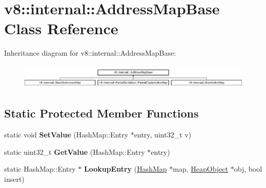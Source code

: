 \hypertarget{classv8_1_1internal_1_1_address_map_base}{}\section{v8\+:\+:internal\+:\+:Address\+Map\+Base Class Reference}
\label{classv8_1_1internal_1_1_address_map_base}
Inheritance diagram for v8\+:\+:internal\+:\+:Address\+Map\+Base\+:\begin{figure}[H]
\begin{center}
\leavevmode
\includegraphics[height=1.196581cm]{classv8_1_1internal_1_1_address_map_base}
\end{center}
\end{figure}
\subsection*{Static Protected Member Functions}
\begin{DoxyCompactItemize}
\item 
static void {\bfseries Set\+Value} (Hash\+Map\+::\+Entry $\ast$entry, uint32\+\_\+t v)\hypertarget{classv8_1_1internal_1_1_address_map_base_ad901a40bc8f6ae8364f2fdaf10e46ee9}{}\label{classv8_1_1internal_1_1_address_map_base_ad901a40bc8f6ae8364f2fdaf10e46ee9}

\item 
static uint32\+\_\+t {\bfseries Get\+Value} (Hash\+Map\+::\+Entry $\ast$entry)\hypertarget{classv8_1_1internal_1_1_address_map_base_ac940b73338cebdd25c26ea0dea9a6512}{}\label{classv8_1_1internal_1_1_address_map_base_ac940b73338cebdd25c26ea0dea9a6512}

\item 
static Hash\+Map\+::\+Entry $\ast$ {\bfseries Lookup\+Entry} (\hyperlink{classv8_1_1internal_1_1_template_hash_map_impl}{Hash\+Map} $\ast$map, \hyperlink{classv8_1_1internal_1_1_heap_object}{Heap\+Object} $\ast$obj, bool insert)\hypertarget{classv8_1_1internal_1_1_address_map_base_a7753d398808cd59ba39d0de9a87a0912}{}\label{classv8_1_1internal_1_1_address_map_base_a7753d398808cd59ba39d0de9a87a0912}

\end{DoxyCompactItemize}
